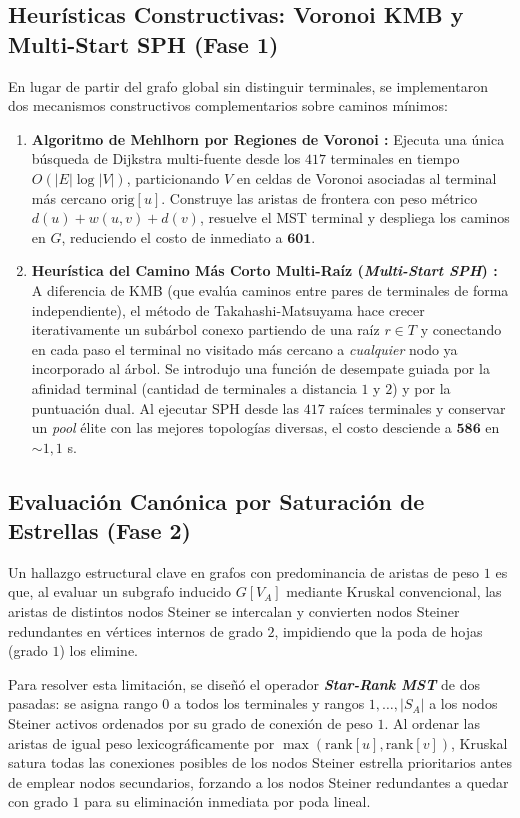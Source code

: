 \documentclass[11pt,a4paper]{article}
\begin{document}
\subsection{Heurísticas Constructivas: Voronoi KMB y Multi-Start SPH (Fase 1)}
En lugar de partir del grafo global sin distinguir terminales, se implementaron dos mecanismos constructivos complementarios sobre caminos mínimos:
\begin{enumerate}
    \item \textbf{Algoritmo de Mehlhorn por Regiones de Voronoi \cite{kou1981fast,mehlhorn1988faster}:} Ejecuta una única búsqueda de Dijkstra multi-fuente desde los $417$ terminales en tiempo $O(|E| \log |V|)$, particionando $V$ en celdas de Voronoi asociadas al terminal más cercano $\text{orig}[u]$. Construye las aristas de frontera con peso métrico $d(u) + w(u,v) + d(v)$, resuelve el MST terminal y despliega los caminos en $G$, reduciendo el costo de inmediato a $\mathbf{601}$.
    \item \textbf{Heurística del Camino Más Corto Multi-Raíz (\textit{Multi-Start SPH}) \cite{takahashi1980approximate}:} A diferencia de KMB (que evalúa caminos entre pares de terminales de forma independiente), el método de Takahashi-Matsuyama hace crecer iterativamente un subárbol conexo partiendo de una raíz $r \in T$ y conectando en cada paso el terminal no visitado más cercano a \textit{cualquier} nodo ya incorporado al árbol. Se introdujo una función de desempate guiada por la afinidad terminal (cantidad de terminales a distancia $1$ y $2$) y por la puntuación dual. Al ejecutar SPH desde las $417$ raíces terminales y conservar un \textit{pool} élite con las mejores topologías diversas, el costo desciende a $\mathbf{586}$ en $\sim 1,1$ s.
\end{enumerate}

\subsection{Evaluación Canónica por Saturación de Estrellas (Fase 2)}
Un hallazgo estructural clave en grafos con predominancia de aristas de peso $1$ es que, al evaluar un subgrafo inducido $G[V_A]$ mediante Kruskal convencional, las aristas de distintos nodos Steiner se intercalan y convierten nodos Steiner redundantes en vértices internos de grado $2$, impidiendo que la poda de hojas (grado $1$) los elimine.

Para resolver esta limitación, se diseñó el operador \textbf{\textit{Star-Rank MST}} de dos pasadas: se asigna rango $0$ a todos los terminales y rangos $1, \dots, |S_A|$ a los nodos Steiner activos ordenados por su grado de conexión de peso $1$. Al ordenar las aristas de igual peso lexicográficamente por $\max(\text{rank}[u], \text{rank}[v])$, Kruskal satura todas las conexiones posibles de los nodos Steiner estrella prioritarios antes de emplear nodos secundarios, forzando a los nodos Steiner redundantes a quedar con grado $1$ para su eliminación inmediata por poda lineal.
\end{document}
